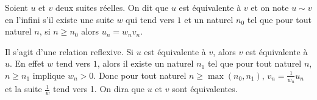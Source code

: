\begin{defdef}
  Soient \(u\) et \(v\) deux suites réelles. On dit que \(u\) est équivalente à \(v\) et on note \(u \sim v\) en l'infini s'il existe une suite \(w\) qui tend vers \(1\) et un naturel \(n_0\) tel que pour tout naturel \(n\), si \(n \geqslant n_0\) alors \(u_n =w_n v_n\).
\end{defdef}

Il s'agit d'une relation reflexive. Si \(u\) est équivalente à \(v\), alors \(v\) est équivalente à \(u\). En effet \(w\) tend vers \(1\), alors il existe un naturel \(n_1\) tel que pour tout naturel \(n\), \(n \geqslant n_1\) implique \(w_n >0\). Donc pour tout naturel \(n \geqslant \max(n_0,n_1)\), \(v_n = \frac{1}{w_n} u_n\) et la suite \(\frac{1}{w}\) tend vers 1. On dira que \(u\) et \(v\) sont équivalentes.


